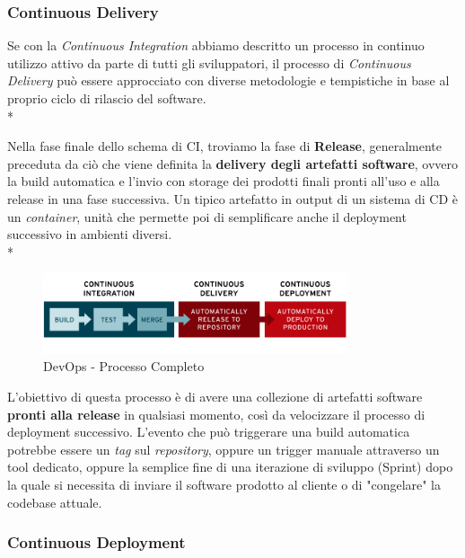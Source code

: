 \documentclass[a4paper,12pt]{report}
\begin{document}
				\subsubsection{Continuous Delivery}
					
					Se con la \emph{Continuous Integration} abbiamo descritto un processo in continuo utilizzo attivo da parte di tutti gli sviluppatori, il processo di \emph{Continuous Delivery} può essere approcciato con diverse metodologie e tempistiche in base al proprio ciclo di rilascio del software.\\*
					
					Nella fase finale dello schema di CI, troviamo la fase di \textbf{Release}, generalmente preceduta da ciò che viene definita la \textbf{delivery degli artefatti software}, ovvero la build automatica e l'invio con storage dei prodotti finali pronti all'uso e alla release in una fase successiva. Un tipico artefatto in output di un sistema di CD è un \emph{container}, unità che permette poi di semplificare anche il deployment successivo in ambienti diversi.\\*
					
					\begin{figure}[ht]
						\centering
						\includegraphics[width=0.8\textwidth]{ci_cd_flow}
						\caption{DevOps - Processo Completo}
						\label{fig:ci_cd_flow}
					\end{figure}
					
					L'obiettivo di questa processo è di avere una collezione di artefatti software \textbf{pronti alla release} in qualsiasi momento, così da velocizzare il processo di deployment successivo. L'evento che può triggerare una build automatica potrebbe essere un \emph{tag} sul \emph{repository}, oppure un trigger manuale attraverso un tool dedicato, oppure la semplice fine di una iterazione di sviluppo (Sprint) dopo la quale si necessita di inviare il software prodotto al cliente o di "congelare" la codebase attuale.
				
				\subsubsection{Continuous Deployment}
				
\end{document}
